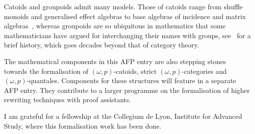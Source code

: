\documentclass[11pt,a4paper]{article}
\begin{document}
Catoids and groupoids admit many models. Those of catoids range from
shuffle monoids and generalised effect algebras to base algebras of
incidence and matrix algebras~\cite{FahrenbergJSZ23}, whereas
groupoids are so ubiquitous in mathematics that some mathematicians
have argued for interchanging their names with groups,
see~\cite{Brown87} for a brief history, which goes decades beyond that
of category theory.

The mathematical components in this AFP entry are also stepping stones
towards the formalisation of $(\omega,p)$-catoids, strict
$(\omega,p)$-categories and $(\omega,p)$-quantales. Components for
these structures will feature in a separate AFP entry. They contribute
to a larger programme on the formalisation of higher rewriting
techniques with proof assistants.

 \vspace{\baselineskip}

 I am grateful for a fellowship at the Collegium de Lyon, Institute
 for Advanced Study, where this formalisation work has been done.





\end{document}
